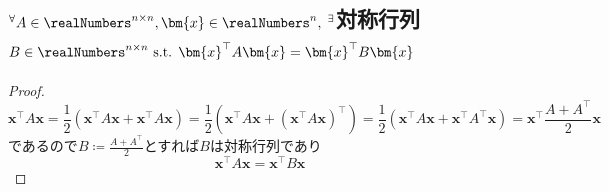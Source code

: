         \subsection{\texorpdfstring{$^\forall A\in\realNumbers^{n\times n},\bm{x}\in\realNumbers^n,\;^\exists$}{∀A∈R\string^(n×n), x∈R\string^n, ∃}対称行列\texorpdfstring{$B\in\realNumbers^{n\times n} \text{ s.t. } \bm{x}^\top A\bm{x} = \bm{x}^\top B\bm{x}$}{B∈R\string^(n×n) s.t. x\string^⊤Ax}}
            \begin{proof}
                \quad\par
                \[\bm{x}^\top A\bm{x} = \frac{1}{2}\left(\bm{x}^\top A\bm{x} + \bm{x}^\top A\bm{x}\right) = \frac{1}{2}\left(\bm{x}^\top A\bm{x} + \left(\bm{x}^\top A\bm{x}\right)^\top\right) = \frac{1}{2}\left(\bm{x}^\top A\bm{x} + \bm{x}^\top A^\top\bm{x}\right) = \bm{x}^\top\frac{A+A^\top}{2}\bm{x}\]
                であるので$B \coloneq \frac{A+A^\top}{2}$とすれば$B$は対称行列であり
                \[\bm{x}^\top A\bm{x} = \bm{x}^\top B\bm{x}\]
            \end{proof}